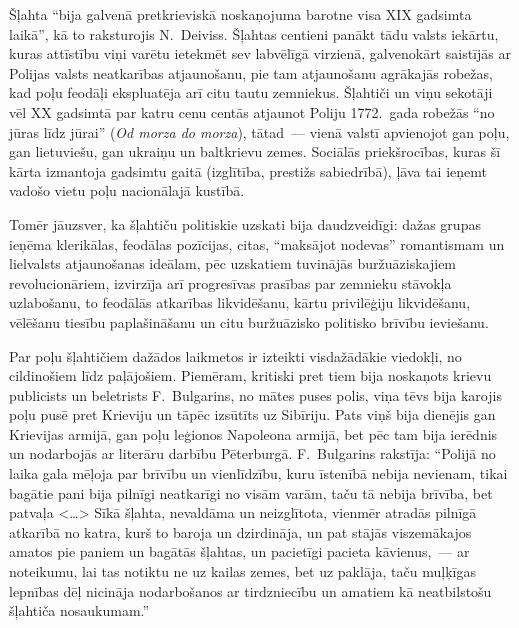 \documentclass[twoside,a5paper,12pt,fleqn,openany]{extbook}
\newcommand{\pltxti}[1]{\textit{\textpolish{#1}}}
\newcommand{\citespace}{<\dots{}>}
\begin{document}
Šļahta ``bija galvenā pretkrieviskā noskaņojuma barotne visa XIX gadsimta laikā'', kā to raksturojis N.~Deiviss. Šļahtas centieni panākt tādu valsts iekārtu, kuras attīstību viņi varētu ietekmēt sev labvēlīgā virzienā, galvenokārt saistījās ar Polijas valsts neatkarības atjaunošanu, pie tam atjaunošanu agrākajās robežas, kad poļu feodāļi ekspluatēja arī citu tautu zemniekus. Šļahtiči un viņu sekotāji vēl XX gadsimtā par katru cenu centās atjaunot Poliju 1772.~gada robežās ``no jūras līdz jūrai'' (\pltxti{Od morza do morza}), tātad~--- vienā valstī apvienojot gan poļu, gan lietuviešu, gan ukraiņu un baltkrievu zemes. Sociālās priekšrocības, kuras šī kārta izmantoja gadsimtu gaitā (izglītība, prestižs sabiedrībā), ļāva tai ieņemt vadošo vietu poļu nacionālajā kustībā.

Tomēr jāuzsver, ka šļahtiču politiskie uzskati bija daudzveidīgi: dažas grupas ieņēma klerikālas, feodālas pozīcijas, citas, ``maksājot nodevas'' romantismam un lielvalsts atjaunošanas ideālam, pēc uzskatiem tuvinājās buržuāziskajiem revolucionāriem, izvirzīja arī progresīvas prasības par zemnieku stāvokļa uzlabošanu, to feodālās atkarības likvidēšanu, kārtu privilēģiju likvidēšanu, vēlēšanu tiesību paplašināšanu un citu buržuāzisko politisko brīvību ieviešanu.

Par poļu šļahtičiem dažādos laikmetos ir izteikti visdažādākie viedokļi, no cildinošiem līdz paļājošiem. Piemēram, kritiski pret tiem bija noskaņots krievu publicists un beletrists F.~Bulgarins, no mātes puses polis, viņa tēvs bija karojis poļu pusē pret Krieviju un tāpēc izsūtīts uz Sibīriju. Pats viņš bija dienējis gan Krievijas armijā, gan poļu leģionos Napoleona armijā, bet pēc tam bija ierēdnis un nodarbojās ar literāru darbību Pēterburgā. F.~Bulgarins rakstīja: ``Polijā no laika gala mēļoja par brīvību un vienlīdzību, kuru īstenībā nebija nevienam, tikai bagātie pani bija pilnīgi neatkarīgi no visām varām, taču tā nebija brīvība, bet patvaļa \citespace{} Sīkā šļahta, nevaldāma un neizglītota, vienmēr atradās pilnīgā atkarībā no katra, kurš to baroja un dzirdināja, un pat stājās viszemākajos amatos pie paniem un bagātās šļahtas, un pacietīgi pacieta kāvienus,~--- ar noteikumu, lai tas notiktu ne uz kailas zemes, bet uz paklāja, taču muļķīgas lepnības dēļ nicināja nodarbošanos ar tirdzniecību un amatiem kā neatbilstošu šļahtiča nosaukumam.''
\end{document}
